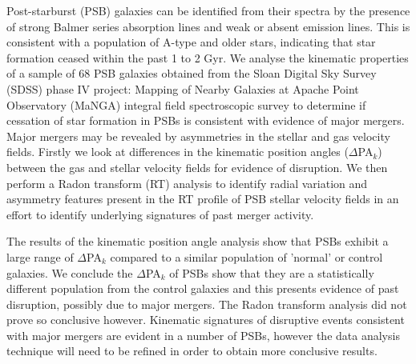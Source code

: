 
Post-starburst (PSB) galaxies can be identified from their spectra by the presence of strong Balmer series absorption lines and weak or absent emission lines. This is consistent with a population of A-type and older stars, indicating that star formation ceased within the past 1 to 2 Gyr. We analyse the kinematic properties of a sample of 68 PSB galaxies obtained from the Sloan Digital Sky Survey (SDSS) phase IV project: Mapping of Nearby Galaxies at Apache Point Observatory (MaNGA) integral field spectroscopic survey to determine if cessation of star formation in PSBs is consistent with evidence of major mergers. Major mergers may be revealed by asymmetries in the stellar and gas velocity fields. Firstly we look at differences in the kinematic position angles ($\Delta$PA$_{k}$) between the gas and stellar velocity fields for evidence of disruption. We then perform a Radon transform (RT) analysis to identify radial variation and asymmetry features present in the RT profile of PSB stellar velocity fields in an effort to identify underlying signatures of past merger activity.

The results of the kinematic position angle analysis show that PSBs exhibit a large range of $\Delta$PA$_{k}$ compared to a similar population of 'normal' or control galaxies. We conclude the $\Delta$PA$_{k}$ of PSBs show that they are a statistically different population from the control galaxies and this presents evidence of past disruption, possibly due to major mergers. The Radon transform analysis did not prove so conclusive however. Kinematic signatures of disruptive events consistent with major mergers are evident in a number of PSBs, however the data analysis technique will need to be refined in order to obtain more conclusive results. 
